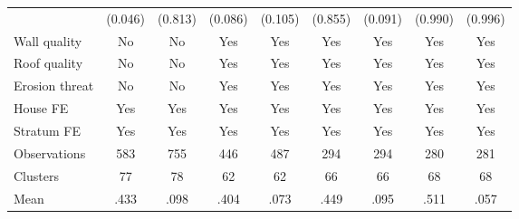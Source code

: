{\begin{tabular}{l*{8}{c}}
                &  (0.046)         &  (0.813)         &  (0.086)         &  (0.105)         &  (0.855)         &  (0.091)         &  (0.990)         &  (0.996)         \\
Wall quality    &       No         &       No         &      Yes         &      Yes         &      Yes         &      Yes         &      Yes         &      Yes         \\
Roof quality    &       No         &       No         &      Yes         &      Yes         &      Yes         &      Yes         &      Yes         &      Yes         \\
Erosion threat  &       No         &       No         &      Yes         &      Yes         &      Yes         &      Yes         &      Yes         &      Yes         \\
House FE        &      Yes         &      Yes         &      Yes         &      Yes         &      Yes         &      Yes         &      Yes         &      Yes         \\
Stratum FE      &      Yes         &      Yes         &      Yes         &      Yes         &      Yes         &      Yes         &      Yes         &      Yes         \\
\hline
Observations    &      583         &      755         &      446         &      487         &      294         &      294         &      280         &      281         \\
Clusters        &       77         &       78         &       62         &       62         &       66         &       66         &       68         &       68         \\
Mean            &     .433         &     .098         &     .404         &     .073         &     .449         &     .095         &     .511         &     .057         \\
\hline\hline
\end{tabular}
}
